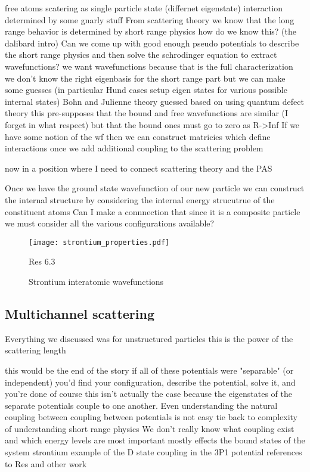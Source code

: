 free atoms
scatering as single particle state (differnet eigenstate)
	interaction determined by some gnarly stuff
From scattering theory we know that the long range behavior is determined by short range physics
	how do we know this? (the dalibard intro)
Can we come up with good enough pseudo potentials to describe the short range physics and then solve the schrodinger equation to extract wavefunctions?
	we want wavefunctions because that is the full characterization
	we don't know the right eigenbasis for the short range part but we can make some guesses (in particular Hund cases setup eigen states for various possible internal states)
	Bohn and Julienne theory guessed based on using quantum defect theory
		this pre-supposes that the bound and free wavefunctions are similar (I forget in what respect) but that the bound ones must go to zero as R->Inf
If we have some notion of the wf then we can construct matricies which define interactions once we add additional coupling to the scattering problem


now in a position where I need to connect scattering theory and the PAS


Once we have the ground state wavefunction of our new particle we can construct the internal structure by considering the internal energy strucutrue of the constituent atoms
	Can I make a connnection that since it is a composite particle we must consider all the various configurations available?
	
\begin{figure} \label{fig:ch3_sr_scat_wf}
	\centerline{
	\texttt{[image: strontium\_properties.pdf]}}
	\caption{Strontium interatomic wavefunctions}{Res 6.3}
\end{figure} 

\subsection{Multichannel scattering} \label{ssec:multi_chan}
Everything we discussed was for unstructured particles
	this is the power of the scattering length
	
this would be the end of the story if all of these potentials were "separable" (or independent)
	you'd find your configuration, describe the potential, solve it, and you're done
of course this isn't actually the case because the eigenstates of the separate potentials couple to one another.
Even understanding the natural coupling between coupling between potentials is not easy
	tie back to complexity of understanding short range physics
		We don't really know what coupling exist and which energy levels are most important
	mostly effects the bound states of the system
	strontium example of the D state coupling in the 3P1 potential
		references to Res and other work

